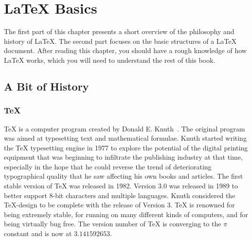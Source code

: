 %
%
%
%

\chapter{\LaTeX{} Basics}\label{chap:basics}
\begin{intro}
  The first part of this chapter presents a short
  overview of the philosophy and history of \LaTeX. The second part
  focuses on the basic structures of a \LaTeX{} document.
  After reading this chapter, you should have a rough knowledge
  of how \LaTeX{} works, which you will need to understand the rest
  of this book.
\end{intro}

\section{A Bit of History}
\subsection{\TeX}

\TeX{} is a computer program created by Donald E. Knuth~\cite{texbook}. The original program was aimed at typesetting text and
mathematical formulae. Knuth started writing the \TeX{} typesetting engine in
1977 to explore the potential of the digital printing equipment that was
beginning to infiltrate the publishing industry at that time, especially in
the hope that he could reverse the trend of deteriorating typographical
quality that he saw affecting his own books and articles. The first stable
version of \TeX{} was released in 1982. Version 3.0 was released in 1989 to
better support 8-bit characters and multiple languages. Knuth considered the
\TeX-design to be complete with the release of Version 3. \TeX{} is renowned
for being extremely stable, for running on many different kinds of computers,
and for being virtually bug free. The version number of \TeX{} is converging
to the \(\pi\) constant and is now at \(3.141592653\).

